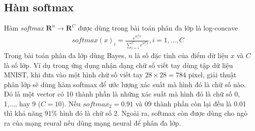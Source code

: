 \documentclass{book}
\begin{document}
\subsection*{Hàm softmax}
Hàm \textit{softmax} $\mathbf{R}^n \rightarrow \mathbf{R}^C$ được dùng trong bài toán phân đa lớp  là log-concave
\begin{align*}
softmax(x)_i = \frac{e^{w_i^T x}}{\sum_{i=1}^C e^{w_i^T x}}, i=1,..., C
\end{align*}
Trong bài toán phân đa lớp dùng Bayes, $n$ là số đặc tính của điểm dữ liệu $x$ và $C$ là số lớp. 
Ví dụ trong ứng dụng nhận dạng chữ số viết tay dùng tập dữ liệu MNIST, khi đưa vào một hình chữ số viết tay $28\times 28 = 784$ pixel, giải thuật phân lớp sẽ dùng hàm softmax để ước lượng xác suất mà hình đó là chữ số nào. Đó là một vector có 10 thành phần là những xác suất mà hình đó là chữ số 0, 1,..., hay 9 ($C=10$). 
Nếu $softmax_2 = 0.91$ và 09 thành phần còn lại đều là 0.01 thì khả năng 91\% hình đó là chữ số 2.
Ngoài ra, softmax còn được dùng cho ngỏ ra của mạng reural nếu dùng mạng neural để phân đa lớp.


\end{document}
